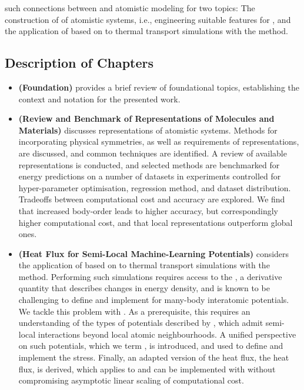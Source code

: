  such connections between \ml and atomistic modeling for two topics: The construction of  of atomistic systems, i.e., engineering suitable features for \ml, and the application of \mlps based on \mpnns to thermal transport simulations with the \gk method.

\subsection{Description of Chapters}

\begin{itemize}[itemsep=0pt,topsep=0.5\baselineskip]
  \item \textbf{ (Foundation)} provides a brief review of foundational topics, establishing the context and notation for the presented work.
  \item \textbf{ (Review and Benchmark of Representations of Molecules and Materials)} discusses representations of atomistic systems. Methods for incorporating physical symmetries, as well as requirements of representations, are discussed, and common techniques are identified. A review of available representations is conducted, and selected methods are benchmarked for energy predictions on a number of datasets in experiments controlled for hyper-parameter optimisation, regression method, and dataset distribution. Tradeoffs between computational cost and accuracy are explored. We find that increased body-order leads to higher accuracy, but correspondingly higher computational cost, and that local representations outperform global ones.
  \item \textbf{ (Heat Flux for Semi-Local Machine-Learning Potentials)} considers the application of \mlps based on \mpnns to thermal transport simulations with the \gk method. Performing such simulations requires access to the , a derivative quantity that describes changes in energy density, and is known to be challenging to define and implement for many-body interatomic potentials. We tackle this problem with \ad. As a prerequisite, this requires an understanding of the types of potentials described by \mpnns, which admit semi-local interactions beyond local atomic neighbourhoods. A unified perspective on such potentials, which we term \glps, is introduced, and used to define and implement the stress. Finally, an adapted version of the heat flux, the  heat flux, is derived, which applies to \glps and can be implemented with \ad without compromising asymptotic linear scaling of computational cost.

\end{itemize}
